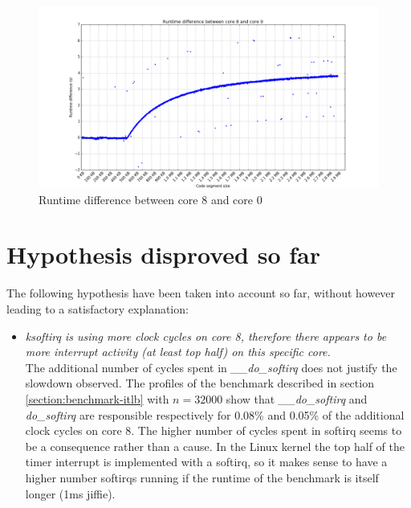 \documentclass[a4paper]{jpconf}
\begin{document}
\begin{figure}[h]
\begin{center}
\includegraphics[scale=0.45]{images/runtime_difference.png}
\end{center}
\caption{\label{fig:runtime-difference} Runtime difference between core 8 and core 0}
\end{figure}

\section{Hypothesis disproved so far}
The following hypothesis have been taken into account so far, without however
leading to a satisfactory explanation:

\begin{itemize}
\item \textit{ksoftirq is using more clock cycles on core 8, therefore there 
appears to be more interrupt activity (at least top half) on this specific core.}
\\
The additional number of cycles spent in \textit{\_\_do\_softirq} does not justify 
the slowdown observed. The profiles of the benchmark described in section
\ref{section:benchmark-itlb} with $n = 32000$ show that \textit{\_\_do\_softirq}
and \textit{do\_softirq} are responsible respectively for 0.08\% and 0.05\% of the 
additional clock cycles on core 8. The higher number of cycles spent in softirq
seems to be a consequence rather than a cause. In the Linux kernel the top half 
of the timer interrupt is implemented with a softirq, so it makes sense to have 
a higher number softirqs running if the runtime of the benchmark is itself longer
(1ms jiffie).
\end{itemize}
\end{document}
